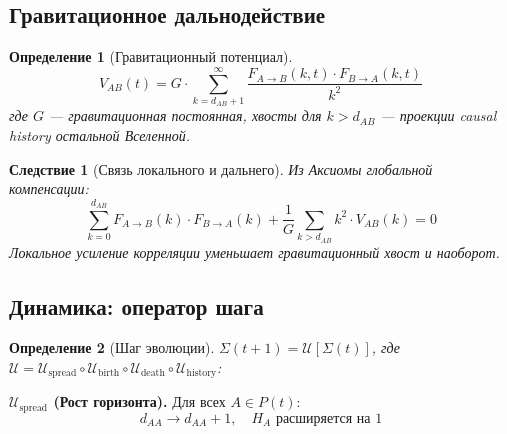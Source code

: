 \documentclass[11pt,a4paper]{article}
\newtheorem{definition}{Определение}[section]
\newtheorem{corollary}{Следствие}[section]
\theoremstyle{definition}
\begin{document}
\subsection{Гравитационное дальнодействие}

\begin{definition}[Гравитационный потенциал]
\begin{equation}
    V_{AB}(t) = G \cdot \sum_{k = d_{AB}+1}^{\infty} \frac{F_{A \to B}(k, t) \cdot F_{B \to A}(k, t)}{k^2}
\end{equation}
где $G$ --- гравитационная постоянная, хвосты для $k > d_{AB}$ --- проекции causal history остальной Вселенной.
\end{definition}

\begin{corollary}[Связь локального и дальнего]
Из Аксиомы глобальной компенсации:
\begin{equation}
    \sum_{k=0}^{d_{AB}} F_{A \to B}(k) \cdot F_{B \to A}(k) + \frac{1}{G} \sum_{k > d_{AB}} k^2 \cdot V_{AB}(k) = 0
\end{equation}
Локальное усиление корреляции уменьшает гравитационный хвост и наоборот.
\end{corollary}

\subsection{Динамика: оператор шага}

\begin{definition}[Шаг эволюции]
$\Sigma(t+1) = \mathcal{U}[\Sigma(t)]$, где $\mathcal{U} = \mathcal{U}_{\text{spread}} \circ \mathcal{U}_{\text{birth}} \circ \mathcal{U}_{\text{death}} \circ \mathcal{U}_{\text{history}}$:
\end{definition}

\textbf{$\mathcal{U}_{\text{spread}}$ (Рост горизонта).}
Для всех $A \in P(t)$:
\begin{equation}
    d_{AA} \to d_{AA} + 1, \quad H_A \text{ расширяется на } 1
\end{equation}
\end{document}
